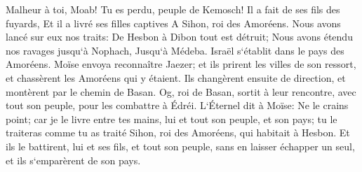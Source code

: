 \verse Malheur à toi, Moab! Tu es perdu, peuple de Kemosch! Il a fait de ses fils des fuyards, Et il a livré ses filles captives A Sihon, roi des Amoréens. 
\verse Nous avons lancé sur eux nos traits: De Hesbon à Dibon tout est détruit; Nous avons étendu nos ravages jusqu`à Nophach, Jusqu`à Médeba. 
\verse Israël s`établit dans le pays des Amoréens. 
\verse Moïse envoya reconnaître Jaezer; et ils prirent les villes de son ressort, et chassèrent les Amoréens qui y étaient. 
\verse Ils changèrent ensuite de direction, et montèrent par le chemin de Basan. Og, roi de Basan, sortit à leur rencontre, avec tout son peuple, pour les combattre à Édréi. 
\verse L`Éternel dit à Moïse: Ne le crains point; car je le livre entre tes mains, lui et tout son peuple, et son pays; tu le traiteras comme tu as traité Sihon, roi des Amoréens, qui habitait à Hesbon. 
\verse Et ils le battirent, lui et ses fils, et tout son peuple, sans en laisser échapper un seul, et ils s`emparèrent de son pays. 

